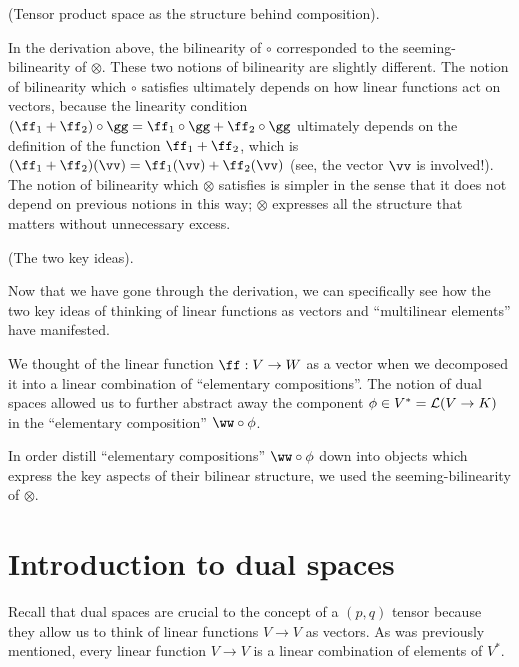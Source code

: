 \begin{remark}
    (Tensor product space as the structure behind composition).
    
    In the derivation above, the bilinearity of $\circ$ corresponded to the seeming-bilinearity of $\otimes$. These two notions of bilinearity are slightly different. The notion of bilinearity which $\circ$ satisfies ultimately depends on how linear functions act on vectors, because the linearity condition $(\ff_1 + \ff_2) \circ \gg = \ff_1 \circ \gg + \ff_2 \circ \gg$ ultimately depends on the definition of the function $\ff_1 + \ff_2$, which is $(\ff_1 + \ff_2)(\vv) = \ff_1(\vv) + \ff_2(\vv)$ (see, the vector $\vv$ is involved!). The notion of bilinearity which $\otimes$ satisfies is simpler in the sense that it does not depend on previous notions in this way; $\otimes$ expresses all the structure that matters without unnecessary excess.
\end{remark}

\begin{remark}
    (The two key ideas). 
    
    Now that we have gone through the derivation, we can specifically see how the two key ideas of thinking of linear functions as vectors and ``multilinear elements'' have manifested.
    
    We thought of the linear function $\ff:V \rightarrow W$ as a vector when we decomposed it into a linear combination of ``elementary compositions''. The notion of dual spaces allowed us to further abstract away the component $\phi \in V^* = \mathcal{L}(V \rightarrow K)$ in the ``elementary composition'' $\ww \circ \phi$.
    
    In order distill ``elementary compositions'' $\ww \circ \phi$ down into objects which express the key aspects of their bilinear structure, we used the seeming-bilinearity of $\otimes$.
\end{remark}

\newpage

\section{Introduction to dual spaces}

Recall that dual spaces are crucial to the concept of a $(p, q)$ tensor because they allow us to think of linear functions $V \rightarrow V$ as vectors. As was previously mentioned, every linear function $V \rightarrow V$ is a linear combination of elements of $V^*$.

